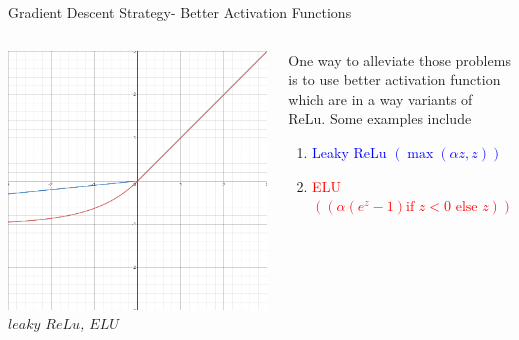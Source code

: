 \begin{frame}{Gradient Descent Strategy- Better Activation Functions}
	\begin{columns}[T]
        \begin{column}{0.5\textwidth}
        	\includegraphics[width=\textwidth]{images/ELU.png}
        	\tiny{\textit{$leaky$ $ReLu$, $ELU$}}
        \end{column}
	    \begin{column}{0.5\textwidth}
    	    One way to alleviate those problems is to use better activation function which are in a way variants of ReLu. Some examples include 
			\begin{enumerate}[$\bullet$]
				\item \textcolor{blue}{Leaky ReLu $\left(\max(\alpha z,z)\right)$}
				\item \textcolor{red}{ELU$\left((\alpha (e^z-1)\text{if $z<0$ else }z)\right)$} 
			\end{enumerate}
    	\end{column}
    \end{columns}
\end{frame}

